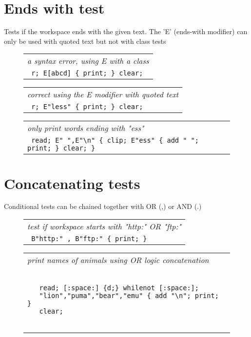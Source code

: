 \documentclass[a4paper,12pt]{article}
\begin{document}
\section{Ends with test}

  Tests if the workspace ends with the given text. The 'E'
  (ends-with modifier) can only be used with quoted text but
  not with class tests
 \begin{figure}
 \begin{tabular}{ l }
 \emph{ a syntax error, using E with a class } \\ 
 \verb| r; E[abcd] { print; } clear; |
 \end{tabular} 
 \end{figure}
 \begin{figure}
 \begin{tabular}{ l }
 \emph{ correct using the E modifier with quoted text } \\ 
 \verb| r; E"less" { print; } clear; |
 \end{tabular} 
 \end{figure}
 \begin{figure}
 \begin{tabular}{ l }
 \emph{ only print words ending with "ess" } \\ 
 \verb| read; E" ",E"\n" { clip; E"ess" { add " "; print; } clear; }  |
 \end{tabular} 
 \end{figure}

\section{Concatenating tests}

  Conditional tests can be chained together with OR (,) or AND (.)
 \begin{figure}
 \begin{tabular}{ l }
 \emph{ test if workspace starts with "http:" OR "ftp:" } \\ 
 \verb| B"http:" , B"ftp:" { print; } |
 \end{tabular} 
 \end{figure}
 \begin{figure}
 \begin{tabular}{ l }
 \emph{ print names of animals using OR logic concatenation } \\ 
 \begin{lstlisting}[breaklines] 

   read; [:space:] {d;} whilenot [:space:];
   "lion","puma","bear","emu" { add "\n"; print; }
   clear;
  
 \end{lstlisting} 
 \end{tabular} 

 \end{figure}
\end{document}

